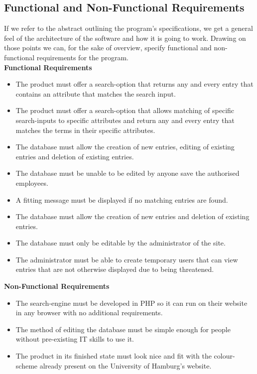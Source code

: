 \documentclass[12pt,a4paper]{article}
\begin{document}
\subsection{Functional and Non-Functional Requirements}

If we refer to the abstract outlining the program's specifications, we get a general feel of the architecture of the software and how it is going to work. Drawing on those points we can, for the sake of overview, specify functional and non-functional requirements for the program.\\

{\bf Functional Requirements}
\begin{itemize}
	\item The product must offer a search-option that returns any and every entry that contains an attribute that matches the search input.
	\item The product must offer a search-option that allows matching of specific search-inputs to specific attributes and return any and every entry that matches the terms in their specific attributes.
	\item The database must allow the creation of new entries, editing of existing entries and deletion of existing entries.
	\item The database must be unable to be edited by anyone save the authorised employees.
	\item A fitting message must be displayed if no matching entries are found.
	\item The database must allow the creation of new entries and deletion of existing entries.
	\item The database must only be editable by the administrator of the site.
	\item The administrator must be able to create temporary users that can view entries that are not otherwise displayed due to being threatened.\\
\end{itemize}
{\bf Non-Functional Requirements}
\begin{itemize}
	\item The search-engine must be developed in PHP so it can run on their website in any browser with no additional requirements.
	\item The method of editing the database must be simple enough for people without pre-existing IT skills to use it.
	\item The product in its finished state must look nice and fit with the colour-scheme already present on the University of Hamburg's website.
\end{itemize}
\newpage
\end{document}
